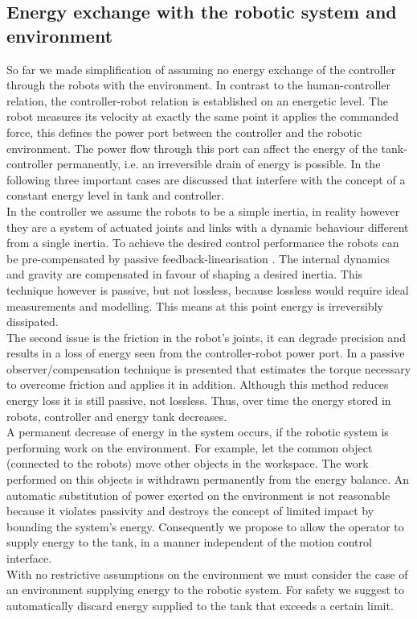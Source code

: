 \documentclass[a4paper,twoside, openright,12pt]{report}
\begin{document}
\subsection{Energy exchange with the robotic system and environment}\label{SS:EnergyExchangeEnvironment}
So far we made simplification of assuming no energy exchange of the controller through the robots with the environment. In contrast to the human-controller relation, the controller-robot relation is established on an energetic level. The robot measures its velocity at exactly the same point it applies the commanded force, this defines the power port between the controller and the robotic environment. The power flow through this port can affect the energy of the tank-controller permanently, i.e. an irreversible drain of  energy is possible. In the following three important cases are discussed that interfere with the concept of a constant energy level in tank and controller.\\ 
In the controller we assume the robots to be a simple inertia, in reality however they are a system of actuated joints and links with a dynamic behaviour different from a  single inertia. To achieve the desired control performance the robots can be pre-compensated by  passive feedback-linearisation \cite{Ott_04}. The internal dynamics and gravity are compensated in favour of shaping a desired inertia. This technique however is passive, but not lossless, because lossless would require ideal measurements and modelling. This means at this point energy is irreversibly dissipated. \\
The second issue is the friction in the robot's joints, it can degrade precision and results in a loss of energy seen from the controller-robot power port. In \cite{Tien_08} a passive observer/compensation technique is presented that estimates the torque necessary to overcome friction and applies it in addition. Although this method reduces energy loss it is still passive, not lossless. Thus, over time the energy stored in robots, controller and energy tank decreases. \\
A permanent decrease of energy in the system occurs, if the robotic system is performing work on the environment. For example, let the common object (connected to the robots) move other objects in the workspace. The work performed on this objects is withdrawn permanently from the energy balance. An automatic substitution of power exerted on the environment is not reasonable because it violates passivity and destroys the concept of limited impact by bounding the system's energy. Consequently we propose to allow the operator to supply energy to the tank, in a manner independent of the motion control interface.\\
With no restrictive assumptions on the environment we must consider the case of an environment supplying energy to the robotic system. For safety we suggest to automatically discard energy supplied to the tank that exceeds a certain limit.
\end{document}
